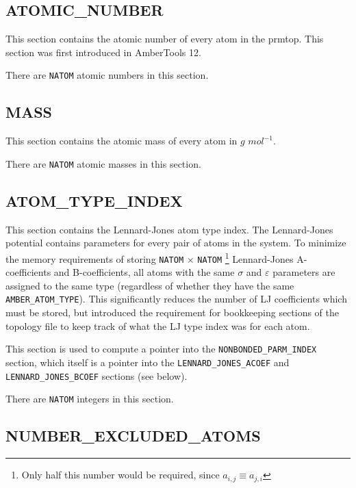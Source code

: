 \subsection*{ATOMIC\_NUMBER}

This section contains the atomic number of every atom in the prmtop. This
section was first introduced in AmberTools 12. \cite{AMBER12}


\noindent There are {\tt NATOM} atomic numbers in this section.

\subsection*{MASS}

This section contains the atomic mass of every atom in $g$ $mol^{-1}$.


\noindent There are {\tt NATOM} atomic masses in this section.

\subsection*{ATOM\_TYPE\_INDEX}

This section contains the Lennard-Jones atom type index. The Lennard-Jones
potential contains parameters for every pair of atoms in the system. To minimize
the memory requirements of storing {\tt NATOM} $\times$ {\tt NATOM}
\footnote{Only half this number would be required, since $a_{i,j} \equiv
a_{j,i}$} Lennard-Jones A-coefficients and B-coefficients, all atoms with the
same $\sigma$ and $\varepsilon$ parameters are assigned to the same type
(regardless of whether they have the same {\tt AMBER\_ATOM\_TYPE}). This
significantly reduces the number of LJ coefficients which must be stored, but
introduced the requirement for bookkeeping sections of the topology file to keep
track of what the LJ type index was for each atom.

This section is used to compute a pointer into the {\tt NONBONDED\_PARM\_INDEX}
section, which itself is a pointer into the {\tt LENNARD\_JONES\_ACOEF} and {\tt
LENNARD\_JONES\_BCOEF} sections (see below).


\noindent There are {\tt NATOM} integers in this section.

\subsection*{NUMBER\_EXCLUDED\_ATOMS}

